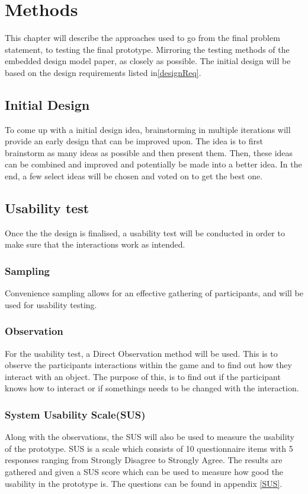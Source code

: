 \chapter{Methods}\label{chap:methods}
    This chapter will describe the approaches used to go from the final problem statement, to testing the final prototype. Mirroring the testing methods of the embedded design model paper\cite{embeddedDesignModel, embeddedDesignModelTestDetails}, as closely as possible. The initial design will be based on the design requirements listed in\autoref{designReq}.
    
    \section{Initial Design}
    To come up with a initial design idea, brainstorming in multiple iterations will provide an early design that can be improved upon. The idea is to first brainstorm as many ideas as possible and then present them. Then, these ideas can be combined and improved and potentially be made into a better idea. In the end, a few select ideas will be chosen and voted on to get the best one.

    \section{Usability test}
    Once the the design is finalised, a usability test will be conducted in order to make sure that the interactions work as intended.
    
    \subsection{Sampling}
    Convenience sampling allows for an effective gathering of participants, and will be used for usability testing\cite{bjoernerBog}.   
    
    \subsection{Observation}
    For the usability test, a Direct Observation method will be used\cite{bjoernerBog}. This is to observe the participants interactions within the game and to find out how they interact with an object. The purpose of this, is to find out if the participant knows how to interact or if somethings needs to be changed with the interaction.
    
    \subsection{System Usability Scale(SUS)}
    Along with the observations, the SUS will also be used to measure the usability of the prototype. SUS is a scale which consists of 10 questionnaire items with 5 responses ranging from Strongly Disagree to Strongly Agree. The results are gathered and given a SUS score which can be used to measure how good the usability in the prototype is\cite{SUS}. The questions can be found in appendix \ref{SUS}.
    
